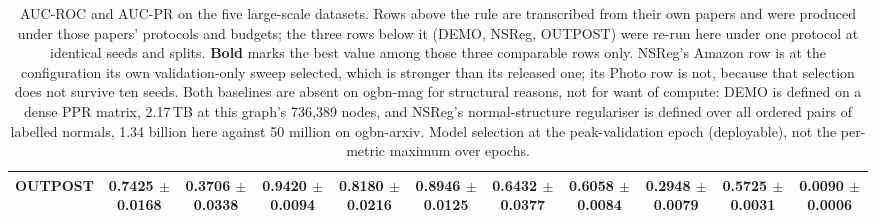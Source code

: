 \begin{table}[t]
\begin{tabular}{lcccccccccc}
\midrule
\textbf{OUTPOST} & \textbf{0.7425 $\pm$ 0.0168} & \textbf{0.3706 $\pm$ 0.0338} & 0.9420 $\pm$ 0.0094 & 0.8180 $\pm$ 0.0216 & 0.8946 $\pm$ 0.0125 & 0.6432 $\pm$ 0.0377 & 0.6058 $\pm$ 0.0084 & 0.2948 $\pm$ 0.0079 & \textbf{0.5725 $\pm$ 0.0031} & \textbf{0.0090 $\pm$ 0.0006} \\
\bottomrule
\end{tabular}
\caption{AUC-ROC and AUC-PR on the five large-scale datasets. Rows above the rule are transcribed from their own papers and were produced under those papers' protocols and budgets; the three rows below it (DEMO, NSReg, OUTPOST) were re-run here under one protocol at identical seeds and splits. \textbf{Bold} marks the best value among those three comparable rows only. NSReg's Amazon row is at the configuration its own validation-only sweep selected, which is stronger than its released one; its Photo row is not, because that selection does not survive ten seeds. Both baselines are absent on ogbn-mag for structural reasons, not for want of compute: DEMO is defined on a dense PPR matrix, 2.17\,TB at this graph's 736{,}389 nodes, and NSReg's normal-structure regulariser is defined over all ordered pairs of labelled normals, 1.34 billion here against 50 million on ogbn-arxiv. Model selection at the peak-validation epoch (deployable), not the per-metric maximum over epochs.}
\label{tab:table2_large_valsel}
\end{table}